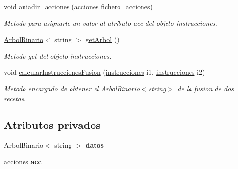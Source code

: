 \begin{DoxyCompactItemize}
void \hyperlink{classinstrucciones_a203c471e9106613471a7a085c4badd47}{aniadir\+\_\+acciones} (\hyperlink{classacciones}{acciones} fichero\+\_\+acciones)
\begin{DoxyCompactList}\small\item\em Metodo para asignarle un valor al atributo acc del objeto instrucciones. \end{DoxyCompactList}\item 
\hyperlink{classArbolBinario}{Arbol\+Binario}$<$ string $>$ \hyperlink{classinstrucciones_a9d538294d3c24242b6fa6b6bcece4896}{get\+Arbol} ()
\begin{DoxyCompactList}\small\item\em Metodo get del objeto instrucciones. \end{DoxyCompactList}\item 
void \hyperlink{classinstrucciones_a06dafbbba27a1bc71f67451d5b183b85}{calcular\+Instrucciones\+Fusion} (\hyperlink{classinstrucciones}{instrucciones} i1, \hyperlink{classinstrucciones}{instrucciones} i2)
\begin{DoxyCompactList}\small\item\em Metodo encargado de obtener el \hyperlink{classArbolBinario}{Arbol\+Binario$<$string$>$} de la fusion de dos recetas. \end{DoxyCompactList}\end{DoxyCompactItemize}
\subsection*{Atributos privados}
\begin{DoxyCompactItemize}
\item 
\mbox{\label{classinstrucciones_a9d1cb99b5b4b9e11f4a6f1be30a324e5}} 
\hyperlink{classArbolBinario}{Arbol\+Binario}$<$ string $>$ {\bfseries datos}
\item 
\mbox{\label{classinstrucciones_ad0bf4d2b4bed18fcb7bfa9ec92d7b651}} 
\hyperlink{classacciones}{acciones} {\bfseries acc}
\end{DoxyCompactItemize}
